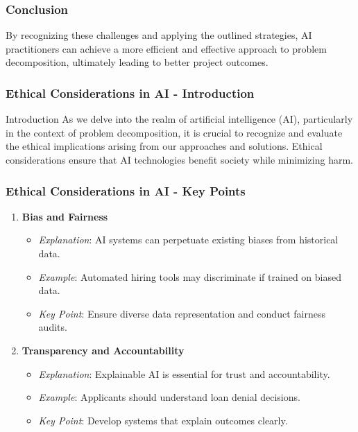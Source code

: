 \documentclass[aspectratio=169]{beamer}
\begin{document}
\begin{frame}[fragile]
    \frametitle{Conclusion}
    By recognizing these challenges and applying the outlined strategies, AI practitioners can achieve a more efficient and effective approach to problem decomposition, ultimately leading to better project outcomes.
\end{frame}

\begin{frame}[fragile]
    \frametitle{Ethical Considerations in AI - Introduction}
    \begin{block}{Introduction}
        As we delve into the realm of artificial intelligence (AI), particularly in the context of problem decomposition, it is crucial to recognize and evaluate the ethical implications arising from our approaches and solutions. Ethical considerations ensure that AI technologies benefit society while minimizing harm.
    \end{block}
\end{frame}

\begin{frame}[fragile]
    \frametitle{Ethical Considerations in AI - Key Points}
    \begin{enumerate}
        \item \textbf{Bias and Fairness}
            \begin{itemize}
                \item \textit{Explanation}: AI systems can perpetuate existing biases from historical data.
                \item \textit{Example}: Automated hiring tools may discriminate if trained on biased data.
                \item \textit{Key Point}: Ensure diverse data representation and conduct fairness audits.
            \end{itemize}
        
        \item \textbf{Transparency and Accountability}
            \begin{itemize}
                \item \textit{Explanation}: Explainable AI is essential for trust and accountability.
                \item \textit{Example}: Applicants should understand loan denial decisions.
                \item \textit{Key Point}: Develop systems that explain outcomes clearly.
            \end{itemize}
    \end{enumerate}
\end{frame}
\end{document}
